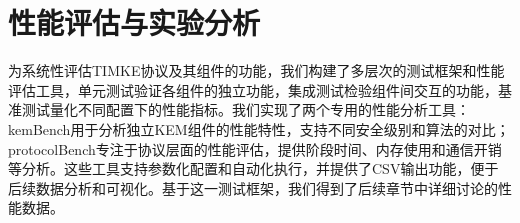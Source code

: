\section{性能评估与实验分析}
\label{chap:performace}

为系统性评估TIMKE协议及其组件的功能，我们构建了多层次的测试框架和性能评估工具，单元测试验证各组件的独立功能，集成测试检验组件间交互的功能，基准测试量化不同配置下的性能指标。我们实现了两个专用的性能分析工具：kemBench用于分析独立KEM组件的性能特性，支持不同安全级别和算法的对比；protocolBench专注于协议层面的性能评估，提供阶段时间、内存使用和通信开销等分析。这些工具支持参数化配置和自动化执行，并提供了CSV输出功能，便于后续数据分析和可视化。基于这一测试框架，我们得到了后续章节中详细讨论的性能数据。


